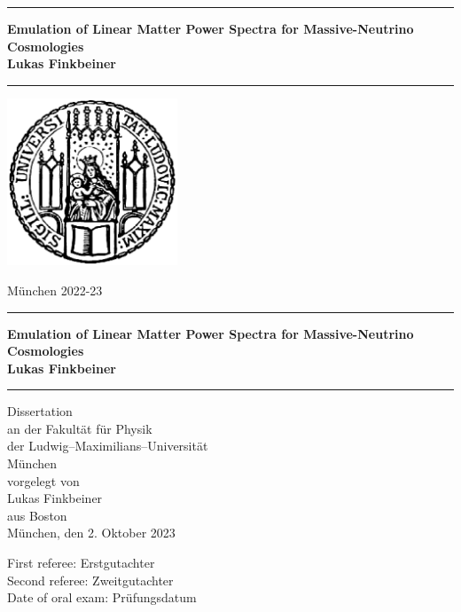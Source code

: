 \documentclass[12pt]{book}
\newcommand{\LMUTitle}[9]{
  \thispagestyle{empty}
  \vspace*{\stretch{1}}
  {\parindent0cm
   \rule{\linewidth}{.7ex}}
  \begin{flushright}

    \vspace*{\stretch{1}}
    \sffamily\bfseries\Huge
    #1\\
    \vspace*{\stretch{1}}
    \sffamily\bfseries\large
    #2
    \vspace*{\stretch{1}}
  \end{flushright}
  \rule{\linewidth}{.7ex}
  \vspace*{\stretch{5}}
  \begin{center}
    \includegraphics[width=2in]{siegel}
  \end{center}
  \vspace*{\stretch{1}}
  \begin{center}\sffamily\LARGE{#5}\end{center}
  \newpage
  \thispagestyle{empty}

  \cleardoublepage
  \thispagestyle{empty}

  \vspace*{\stretch{1}}
  {\parindent0cm
  \rule{\linewidth}{.7ex}}
  \begin{flushright}
    \vspace*{\stretch{1}}
    \sffamily\bfseries\Huge
    #1\\
    \vspace*{\stretch{1}}
    \sffamily\bfseries\large
    #2
    \vspace*{\stretch{1}}
  \end{flushright}
  \rule{\linewidth}{.7ex}

  \vspace*{\stretch{3}}
  \begin{center}
    \Large Dissertation\\
    \Large an der #4\\
    \Large der Ludwig--Maximilians--Universit\"at\\
    \Large M\"unchen\\
    \vspace*{\stretch{1}}
    \Large vorgelegt von\\
    \Large #2\\
    \Large aus #3\\
    \vspace*{\stretch{2}}
    \Large M\"unchen, den #6
  \end{center}

  \newpage
  \thispagestyle{empty}

  \vspace*{\stretch{1}}

  \begin{flushleft}
    \large First referee:  #7 \\[1mm]
    \large Second referee: #8 \\[1mm]
    \large Date of oral exam: #9\\
  \end{flushleft}

  \cleardoublepage
}
\begin{document}
  \frontmatter
  \VerbatimFootnotes

  \LMUTitle
      {Emulation of Linear Matter Power Spectra for Massive-Neutrino Cosmologies}               %
      {Lukas Finkbeiner}                       %
      {Boston}                             %
      {Fakultät für Physik}                         %
      {M\"unchen 2022-23}                          %
      {2. Oktober 2023}                            %
      {Erstgutachter}                          %
      {Zweitgutachter}                         %
      {Pr\"ufungsdatum}                         %


  \tableofcontents


  \listoffigures


  \listoftables
  \cleardoublepage


  


  \mainmatter\setcounter{page}{1}
  
  
  
  
  
  
  


  \backmatter
  
  \markboth{}{}


  


\end{document}
